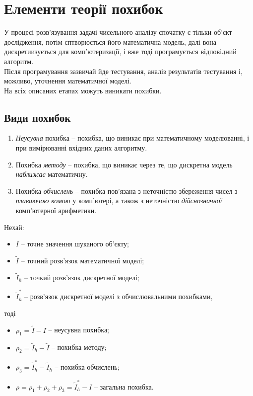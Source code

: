 \setcounter{section}{-1}
\section{Елементи теорії похибок}

У процесі розв'язування задачі чисельного аналізу спочатку є тільки об'єкт дослідження, потім сптворюється його математична модель, далі вона дискретиизується для комп'ютеризації, і вже тоді програмується відповідний алгоритм. \\

Після програмування зазвичай йде тестування, аналіз результатів тестування і, можливо, уточнення математичної моделі. \\

На всіх описаних етапах можуть виникати похибки.

\subsection{Види похибок}

\begin{enumerate}
	\item \textit{Неусувна} похибка -- похибка, що виникає при математичному моделюванні, і при вимірюванні вхідних даних алгоритму.
	\item Похибка \textit{методу} -- похибка, що виникає через те, що дискретна модель \textit{наближає} математичну.
	\item Похибка \textit{обчислень} -- похибка пов'язана з неточністю збереження чисел з \textit{плаваючою комою} у комп'ютері, а також з неточністю \textit{дійснозначної} комп'ютерної арифметики.
\end{enumerate}

Нехай:
\begin{itemize}
	\item $I$ -- точне значення шуканого об'єкту;

	\item $\tilde I$ -- точний розв'язок математичної моделі;

	\item $\tilde I_h$ -- точкий розв'язок дискретної моделі;

	\item $\tilde I_h^*$ -- розв'язок дискретної моделі з обчислювальними похибками,
\end{itemize}
тоді
\begin{itemize}
	\item $\rho_1 = \tilde I - I$ -- неусувна похибка;

	\item $\rho_2 = \tilde I_h - \tilde I$ -- похибка методу;

	\item $\rho_3 = \tilde I_h^* - \tilde I_h$ -- похибка обчислень;

	\item $\rho = \rho_1 + \rho_2 + \rho_3 = \tilde I_h^* - I$ -- загальна похибка.
\end{itemize}

